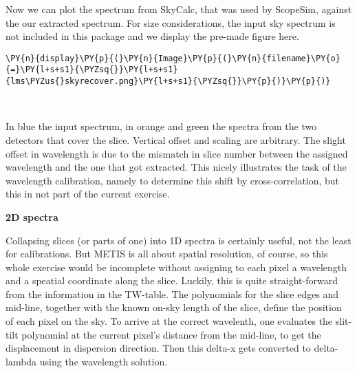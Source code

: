 Now we can plot the spectrum from SkyCalc, that was used by ScopeSim,
against the our extracted spectrum. For size considerations, the input
sky spectrum is not included in this package and we display the pre-made
figure here.

    \begin{tcolorbox}[breakable, size=fbox, boxrule=1pt, pad at break*=1mm,colback=cellbackground, colframe=cellborder]
\begin{Verbatim}[commandchars=\\\{\}]
\PY{n}{display}\PY{p}{(}\PY{n}{Image}\PY{p}{(}\PY{n}{filename}\PY{o}{=}\PY{l+s+s1}{\PYZsq{}}\PY{l+s+s1}{lms\PYZus{}skyrecover.png}\PY{l+s+s1}{\PYZsq{}}\PY{p}{)}\PY{p}{)}
\end{Verbatim}
\end{tcolorbox}

    \begin{center}
    \end{center}
    { \hspace*{\fill} \\}
    
    In blue the input spectrum, in orange and green the spectra from the two
detectors that cover the slice. Vertical offset and scaling are
arbitrary. The slight offset in wavelength is due to the mismatch in
slice number between the assigned wavelength and the one that got
extracted. This nicely illustrates the task of the wavelength
calibration, namely to determine this shift by cross-correlation, but
this in not part of the current exercise.

    \textbf{2D spectra}

Collapsing slices (or parts of one) into 1D spectra is certainly useful,
not the least for calibrations. But METIS is all about spatial
resolution, of course, so this whole exercise would be incomplete
without assigning to each pixel a wavelength and a speatial coordinate
along the slice. Luckily, this is quite straight-forward from the
information in the TW-table. The polynomials for the slice edges and
mid-line, together with the known on-sky length of the slice, define the
position of each pixel on the sky. To arrive at the correct wavelenth,
one evaluates the slit-tilt polynomial at the current pixel's distance
from the mid-line, to get the displacement in dispersion direction. Then
this delta-x gets converted to delta-lambda using the wavelength
solution.

